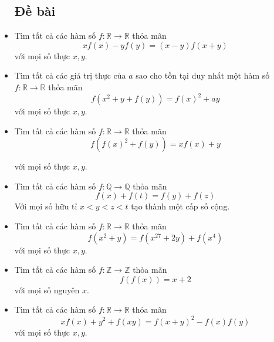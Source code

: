 \documentclass[11pt]{scrartcl}
\begin{document}
\begin{itemize}[label=, leftmargin=0em, itemsep=-0em]
    \subsection{\LARGE \textcolor{dk}{Đề bài}}
    \item \begin{btvn}
        Tìm tất cả các hàm số $f: \mathbb{R} \to \mathbb{R}$ thỏa mãn
        \[
            xf(x) -yf(y) =(x - y)f(x + y)
        \]
        với mọi số thực $x,y$.
    \end{btvn}
    \item \begin{btvn}
        Tìm tất cả các giá trị thực của $a$ sao cho tồn tại duy nhất một hàm số $f: \mathbb{R} \to \mathbb{R}$ thỏa mãn
        \[
           f(x^2 + y+f(y)) = f(x)^2 + ay
        \]
        với mọi số thực $x,y$.
    \end{btvn}
    \item \begin{btvn}
        Tìm tất cả các hàm số $f: \mathbb{R} \to \mathbb{R}$ thỏa mãn
        \[
            f(f(x)^2 + f(y)) = xf(x) + y
        \]
    \end{btvn}
    với mọi số thực $x,y$.
    \item \begin{btvn}
        Tìm tất cả các hàm số $f: \mathbb{Q} \to \mathbb{Q}$ thỏa mãn
        \[
            f(x) + f(t) = f(y) + f(z)
        \]
        Với mọi số hữu tỉ $x < y < z < t$ tạo thành một cấp số cộng.
    \end{btvn}
    \item \begin{btvn}
        Tìm tất cả các hàm số $f: \mathbb{R} \to \mathbb{R}$ thỏa mãn
        \[
           f(x^2 + y) = f(x^{27} + 2y) + f(x^4)
        \]
        với mọi số thực $x,y$.
    \end{btvn}
    \item \begin{btvn}
        Tìm tất cả các hàm số $f: \mathbb{Z} \to \mathbb{Z}$ thỏa mãn
        \[
           f(f(x)) = x + 2
        \]
        với mọi số nguyên $x$.
    \end{btvn}
    \item \begin{btvn}
        Tìm tất cả các hàm số $f: \mathbb{R} \to \mathbb{R}$ thỏa mãn
        \[
           xf(x) + y^2 + f(xy) = f(x + y)^2 -f(x)f(y)
        \]
        với mọi số thực $x,y$.
    \end{btvn}

\end{itemize}
\end{document}

